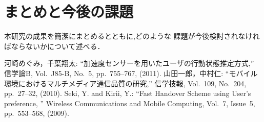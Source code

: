 \documentclass[twocolumn, a4paper]{icethesisabst}
\begin{document}
\section{まとめと今後の課題}
本研究の成果を簡潔にまとめるとともに,どのような
課題が今後検討されなければならないかについて述べる．

\begin{thebibliography}{99}
河崎めぐみ，千葉翔太:
``加速度センサーを用いたユーザの行動状態推定方式,''
信学論B, Vol.~J85-B, No.~5, pp.~755--767, (2011).
山田一郎，中村仁:
``モバイル環境におけるマルチメディア通信品質の研究,''
信学技報, Vol.~109, No.~204, pp.~27--32, (2010).
Seki, Y. and Kirii, Y.:
``Fast Handover Scheme using User's preference, ''
Wireless Communications and Mobile Computing,
Vol.~7, Issue~5, pp.~553--568, (2009).
\end{thebibliography}
\end{document}
